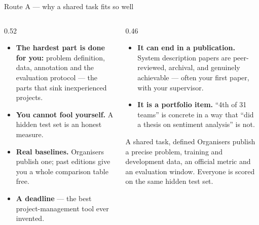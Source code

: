 \documentclass[aspectratio=169,11pt]{beamer}
\newcommand{\key}[1]{\textbf{\color{brand}#1}}
\begin{document}
\begin{frame}{Route A --- why a shared task fits so well}
\begin{columns}[T]
\begin{column}{0.52\textwidth}
\footnotesize
\begin{itemize}
  \item \key{The hardest part is done for you:} problem definition, data,
        annotation and the evaluation protocol --- the parts that sink
        inexperienced projects.
  \item \key{You cannot fool yourself.} A hidden test set is an honest measure.
  \item \key{Real baselines.} Organisers publish one; past editions give you a
        whole comparison table free.
  \item \key{A deadline} --- the best project-management tool ever invented.
\end{itemize}
\end{column}
\begin{column}{0.46\textwidth}
\footnotesize
\begin{itemize}
  \item \key{It can end in a publication.} System description papers are
        peer-reviewed, archival, and genuinely achievable --- often your first
        paper, with your supervisor.
  \item \key{It is a portfolio item.} ``4th of 31 teams'' is concrete in a way
        that ``did a thesis on sentiment analysis'' is not.
\end{itemize}
\medskip
\begin{block}{A shared task, defined}
\footnotesize
Organisers publish a precise problem, training and development data, an
official metric and an evaluation window. Everyone is scored on the same hidden
test set.
\end{block}
\end{column}
\end{columns}
\end{frame}
\end{document}
